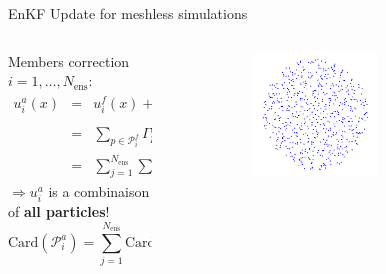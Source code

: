 \documentclass[aspectratio=169]{beamer} %
\begin{document}
\begin{frame}{EnKF Update for meshless simulations}

    \begin{columns}[t]
        \begin{column}{0.7\textwidth}
            Members correction $i = 1, \dots, N_{\text{ens}}$: \\
            \vspace{-0.50cm}
            \begin{eqnarray*}
                u_i^a(x) &=& u^f_i(x) + \sum_{j=1}^{N_{\text{ens}}} F_{ij}~u^f_j(x), \\
                &=& \sum_{p \in \mathcal{P}^f_i} \Gamma^f_p \phi_h(x - x_p) + \sum_{j=1}^{N_{\text{ens}}} F_{ij} \sum_{{p'} \in \mathcal{P}_j^f} \Gamma^f_{p'} \phi_h(x - x_{p'}), \\
                &=& \sum_{j=1}^{N_{\text{ens}}} \sum_{ p \in \mathcal{P}^f_i} \Gamma^a_p \phi_h (x - x_p)
            \end{eqnarray*}
            \vspace{-0.10cm}
            $\Rightarrow u_i^a$ is a combinaison of \textbf{all particles}! \\
            \vspace{-0.10cm}
            \begin{equation*}\text{Card}(\mathcal P^a_i) = \sum_{j=1}^{N_{\text{ens}}}\text{Card}(\mathcal P^f_j)
            \end{equation*}
        \end{column}
        \begin{column}{0.3\textwidth}
            \vspace{-1cm}
            \begin{figure}
                \centering
                \begin{subfigure}{\textwidth}
                    \centering
                    \includegraphics[width=0.7\textwidth]{../../conference/images/memb_particles.pdf}

\end{subfigure}
\end{figure}
\end{column}
\end{columns}
\end{frame}
\end{document}
